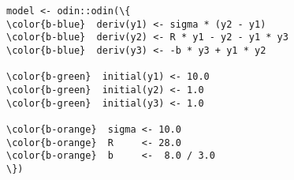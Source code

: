 \documentclass[class=minimal,border=0]{standalone}
\begin{document}
%
\begin{BVerbatim}[bgcolor=b-darkgrey]
model <- odin::odin(\{
\color{b-blue}  deriv(y1) <- sigma * (y2 - y1)
\color{b-blue}  deriv(y2) <- R * y1 - y2 - y1 * y3
\color{b-blue}  deriv(y3) <- -b * y3 + y1 * y2

\color{b-green}  initial(y1) <- 10.0
\color{b-green}  initial(y2) <- 1.0
\color{b-green}  initial(y3) <- 1.0

\color{b-orange}  sigma <- 10.0
\color{b-orange}  R     <- 28.0
\color{b-orange}  b     <-  8.0 / 3.0
\})
\end{BVerbatim}
\end{document}
